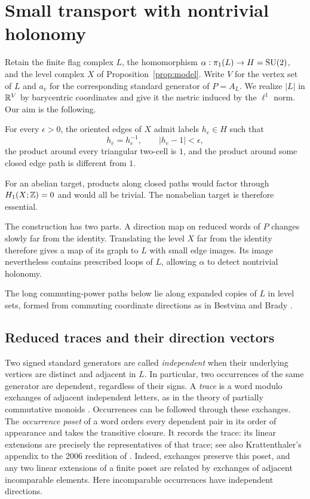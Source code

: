 \section{Small transport with nontrivial holonomy}\label{sec:transport}

Retain the finite flag complex $L$, the homomorphism
$\alpha:\pi_1(L)\to H=\operatorname{SU}(2)$, and the level complex $X$ of
Proposition~\ref{prop:model}.  Write $V$ for the vertex set of $L$ and
$a_v$ for the corresponding standard generator of $P=A_L$.
We realize $|L|$ in $\mathbb R^V$ by barycentric coordinates and give it the
metric induced by the $\ell^1$ norm.  Our aim is the following.

\begin{proposition}\label{prop:small-labels}
For every $\epsilon>0$, the oriented edges of $X$ admit labels
$h_e\in H$ such that
\[
 h_{\bar e}=h_e^{-1},\qquad |h_e-1|<\epsilon,
\]
the product around every triangular two-cell is $1$, and the product
around some closed edge path is different from $1$.
\end{proposition}

For an abelian target, products along closed paths would factor through
$H_1(X;\mathbb Z)=0$ and would all be trivial.  The nonabelian target is
therefore essential.

The construction has two parts.  A direction map on reduced words of
$P$ changes slowly far from the identity.  Translating the level $X$
far from the identity therefore gives a map of its graph to $L$ with
small edge images.  Its image nevertheless contains prescribed loops
of $L$, allowing $\alpha$ to detect nontrivial holonomy.

The long commuting-power paths below lie along expanded copies of $L$
in level sets, formed from commuting coordinate directions as in
Bestvina and Brady
\cite[Definition~8.8 and the following paragraph]{BB1997}.

\subsection{Reduced traces and their direction vectors}

Two signed standard generators are called \emph{independent} when
their underlying vertices are distinct and adjacent in $L$.
In particular, two occurrences of the same generator are dependent,
regardless of their signs.  A \emph{trace} is a word modulo exchanges
of adjacent independent letters, as in the theory of partially
commutative monoids \cite[Chapter~I, Section~2]{CartierFoata1969}.  Occurrences can be followed through
these exchanges.  The \emph{occurrence poset} of a word orders every
dependent pair in its order of appearance and takes the transitive
closure.  It records the trace: its linear extensions are precisely
the representatives of that trace; see also Krattenthaler's appendix
to the 2006 reedition of \cite[Definition~2.2 and Section~3 of the appendix]{CartierFoata1969}.
Indeed, exchanges preserve this
poset, and any two linear extensions of a finite poset are related by
exchanges of adjacent incomparable elements.  Here incomparable
occurrences have independent directions.

